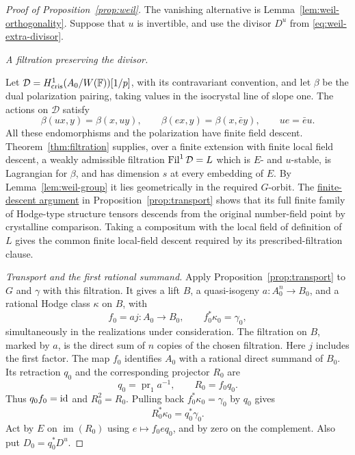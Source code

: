 \begin{proof}[Proof of Proposition~\ref{prop:weil}]
The vanishing alternative is Lemma~\ref{lem:weil-orthogonality}.
Suppose that $u$ is invertible, and use the divisor $D^u$ from
\eqref{eq:weil-extra-divisor}.

\medskip\noindent
\emph{A filtration preserving the divisor.}

Let $\mathcal D=H^1_{\mathrm{cris}}(A_0/W(\mathbb F))[1/p]$, with its
contravariant convention, and let $\beta$ be the dual polarization
pairing, taking values in the isocrystal line of slope one.  The
actions on $\mathcal D$ satisfy
\[
 \beta(ux,y)=\beta(x,uy),\qquad
 \beta(ex,y)=\beta(x,\bar e y),\qquad ue=\bar e u.
\]
All these endomorphisms and the polarization have finite field
descent.  Theorem~\ref{thm:filtration} supplies, over a finite
extension with finite local field descent, a weakly admissible
filtration $\operatorname{Fil}^1\mathcal D=L$ which is $E$- and $u$-stable,
is Lagrangian for $\beta$, and has dimension $s$ at every embedding
of $E$.  By Lemma~\ref{lem:weil-group} it lies geometrically in the
required $G$-orbit.  The
\hyperref[par:transport-tensor-descent]{finite-descent argument} in
Proposition~\ref{prop:transport} shows that its full finite family of
Hodge-type structure tensors descends from the original number-field
point by crystalline comparison.  Taking a compositum with the local
field of definition of $L$ gives the common finite local-field descent
required by its prescribed-filtration clause.

\medskip\noindent
\emph{Transport and the first rational summand.}
Apply Proposition~\ref{prop:transport} to $G$ and $\gamma$ with this
filtration.  It gives a lift $B$, a
quasi-isogeny $a:A_0^n\longrightarrow B_0$, and a rational Hodge
class $\kappa$ on $B$, with
\[
 f_0=aj:A_0\longrightarrow B_0,\qquad
 f_0^*\kappa_0=\gamma_0,
\]
simultaneously in the realizations under consideration.  The
filtration on $B$, marked by $a$, is the direct sum of $n$ copies of
the chosen filtration.  Here $j$ includes the first factor.  The map
$f_0$ identifies $A_0$ with a rational direct summand of $B_0$.
Its retraction $q_0$ and the corresponding projector $R_0$ are
\begin{equation}\label{eq:weil-projector-identity}
 q_0=\operatorname{pr}_1a^{-1},\qquad R_0=f_0q_0.
\end{equation}
Thus $q_0f_0=\operatorname{id}$ and $R_0^2=R_0$.  Pulling back
$f_0^*\kappa_0=\gamma_0$ by $q_0$ gives
\[
 R_0^*\kappa_0=q_0^*\gamma_0.
\]
Act by $E$ on $\operatorname{im}(R_0)$ using $e\mapsto f_0e q_0$,
and by zero on the complement.  Also put $D_0=q_0^*D^u$.


\end{proof}
